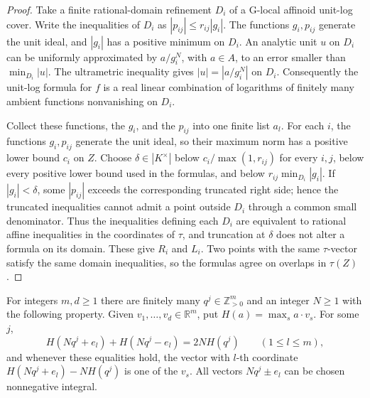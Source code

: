 \documentclass[11pt,a4paper]{amsart}
\begin{document}
\begin{proof}
Take a finite rational-domain refinement $D_i$ of a G-local affinoid unit-log cover. Write the inequalities of $D_i$ as $|p_{ij}|\leq r_{ij}|g_i|$. The functions $g_i,p_{ij}$ generate the unit ideal, and $|g_i|$ has a positive minimum on $D_i$. An analytic unit $u$ on $D_i$ can be uniformly approximated by $a/g_i^N$, with $a\in A$, to an error smaller than $\min_{D_i}|u|$. The ultrametric inequality gives $|u|=|a/g_i^N|$ on $D_i$. Consequently the unit-log formula for $f$ is a real linear combination of logarithms of finitely many ambient functions nonvanishing on $D_i$.

Collect these functions, the $g_i$, and the $p_{ij}$ into one finite list $a_l$. For each $i$, the functions $g_i,p_{ij}$ generate the unit ideal, so their maximum norm has a positive lower bound $c_i$ on $Z$. Choose $\delta\in|K^\times|$ below $c_i/\max(1,r_{ij})$ for every $i,j$, below every positive lower bound used in the formulas, and below $r_{ij}\min_{D_i}|g_i|$. If $|g_i|<\delta$, some $|p_{ij}|$ exceeds the corresponding truncated right side; hence the truncated inequalities cannot admit a point outside $D_i$ through a common small denominator. Thus the inequalities defining each $D_i$ are equivalent to rational affine inequalities in the coordinates of $\tau$, and truncation at $\delta$ does not alter a formula on its domain. These give $R_i$ and $L_i$. Two points with the same $\tau$-vector satisfy the same domain inequalities, so the formulas agree on overlaps in $\tau(Z)$.
\end{proof}

\begin{lemma}\label{lem:support-vector-selection}
For integers $m,d\geq1$ there are finitely many $q^j\in\mathbb Z_{>0}^m$ and an integer $N\geq1$ with the following property. Given $v_1,\ldots,v_d\in\mathbb R^m$, put $H(a)=\max_s a\cdot v_s$. For some $j$,
\begin{equation}\label{eq:support-vector-equality}
 H(Nq^j+e_l)+H(Nq^j-e_l)=2NH(q^j)\qquad(1\leq l\leq m),
\end{equation}
and whenever these equalities hold, the vector with $l$-th coordinate $H(Nq^j+e_l)-NH(q^j)$ is one of the $v_s$. All vectors $Nq^j\pm e_l$ can be chosen nonnegative integral.
\end{lemma}
\end{document}
